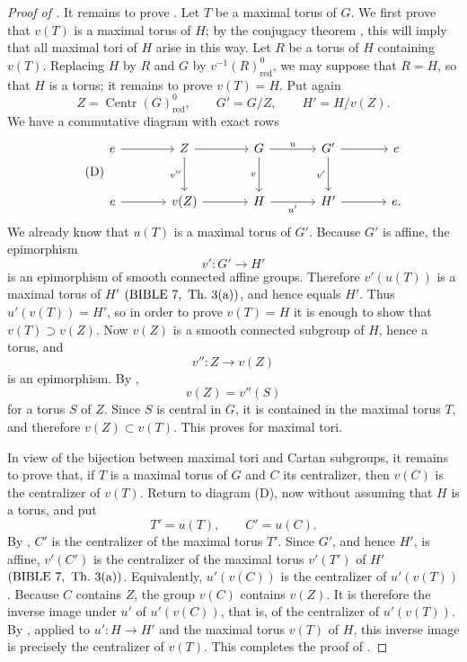 \begin{proof}[Proof of ]
It remains to prove \textup{}. Let \(T\) be a maximal torus of
\(G\). We first prove that \(v(T)\) is a maximal torus of \(H\);
by the conjugacy theorem \textup{}, this will imply that all
maximal tori of \(H\) arise in this way. Let \(R\) be a torus of
\(H\) containing \(v(T)\). Replacing \(H\) by \(R\) and \(G\) by
\(v^{-1}(R)_{\mathrm{red}}^{0}\), we may suppose that \(R=H\), so
that \(H\) is a torus; it remains to prove \(v(T)=H\). Put again
\[
  Z=\operatorname{Centr}(G)_{\mathrm{red}}^{0},
  \qquad G'=G/Z,\qquad H'=H/v(Z).
\]
We have a commutative diagram with exact rows
\begin{equation}
\tag{D}\label{sga3:xii:corollary:6-7:equation:d}
\begin{tikzcd}[column sep=large,row sep=large]
e \arrow[r] &
Z \arrow[r] \arrow[d,"v''"'] &
G \arrow[r,"u"] \arrow[d,"v"'] &
G' \arrow[r] \arrow[d,"v'"'] &
e \\
e \arrow[r] &
v(Z) \arrow[r] &
H \arrow[r,"u'"'] &
H' \arrow[r] &
e .
\end{tikzcd}
\end{equation}
We already know that \(u(T)\) is a maximal torus of \(G'\).
Because \(G'\) is affine, the epimorphism
\[
  v':G'\longrightarrow H'
\]
is an epimorphism of smooth connected affine groups. Therefore
\(v'(u(T))\) is a maximal torus of \(H'\)
\((\mathrm{BIBLE}\ 7,\ \mathrm{Th.}\ 3\textup{(a)})\), and hence
equals \(H'\). Thus \(u'(v(T))=H'\), so in order to prove
\(v(T)=H\) it is enough to show that \(v(T)\supset v(Z)\). Now
\(v(Z)\) is a smooth connected subgroup of \(H\), hence a torus,
and
\[
  v'':Z\longrightarrow v(Z)
\]
is an epimorphism. By ,
\[
  v(Z)=v''(S)
\]
for a torus \(S\) of \(Z\). Since \(S\) is central in \(G\), it is
contained in the maximal torus \(T\), and therefore
\(v(Z)\subset v(T)\). This proves \textup{} for maximal tori.

In view of the bijection between maximal tori and Cartan subgroups,
it remains to prove that, if \(T\) is a maximal torus of \(G\) and
\(C\) its centralizer, then \(v(C)\) is the centralizer of \(v(T)\).
Return to diagram \textup{(D)}, now without assuming that \(H\) is
a torus, and put
\[
  T'=u(T),\qquad C'=u(C).
\]
By \textup{}, \(C'\) is the centralizer of the maximal torus
\(T'\). Since \(G'\), and hence \(H'\), is affine,
\(v'(C')\) is the centralizer of the maximal torus \(v'(T')\) of
\(H'\)
\((\mathrm{BIBLE}\ 7,\ \mathrm{Th.}\ 3\textup{(a)})\).
Equivalently, \(u'(v(C))\) is the centralizer of \(u'(v(T))\).
Because \(C\) contains \(Z\), the group \(v(C)\) contains \(v(Z)\).
It is therefore the inverse image under \(u'\) of \(u'(v(C))\),
that is, of the centralizer of \(u'(v(T))\). By
\textup{}, applied to \(u':H\to H'\) and the maximal torus
\(v(T)\) of \(H\), this inverse image is precisely the centralizer
of \(v(T)\). This completes the proof of .
\end{proof}
